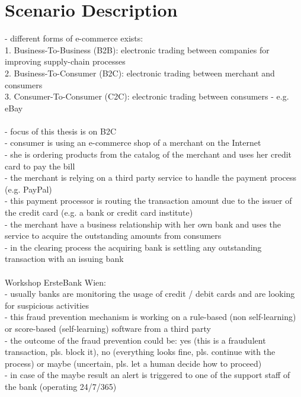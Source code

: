 
\section{Scenario Description}
\label{sec:scenario_description}

- different forms of e-commerce exists: \\
1. Business-To-Business (B2B): electronic trading between companies for improving supply-chain processes \\
2. Business-To-Consumer (B2C): electronic trading between merchant and consumers \\
3. Consumer-To-Consumer (C2C): electronic trading between consumers - e.g. eBay \\
\\
- focus of this thesis is on B2C \\
- consumer is using an e-commerce shop of a merchant on the Internet \\
- she is ordering products from the catalog of the merchant and uses her credit card to pay the bill \\
- the merchant is relying on a third party service to handle the payment process (e.g. PayPal) \\
- this payment processor is routing the transaction amount due to the issuer of the credit card (e.g. a bank or credit card institute) \\
- the merchant have a business relationship with her own bank and uses the service to acquire the outstanding amounts from consumers \\
- in the clearing process the acquiring bank is settling any outstanding transaction with an issuing bank \\
\\
Workshop ErsteBank Wien: \\
- usually banks are monitoring the usage of credit / debit cards and are looking for suspicious activities \\
- this fraud prevention mechanism is working on a rule-based (non self-learning) or score-based (self-learning) software from a third party \\
- the outcome of the fraud prevention could be: yes (this is a fraudulent transaction, pls. block it), no (everything looks fine, pls. continue with the process) or maybe (uncertain, pls. let a human decide how to proceed) \\
- in case of the maybe result an alert is triggered to one of the support staff of the bank (operating 24/7/365) \\
